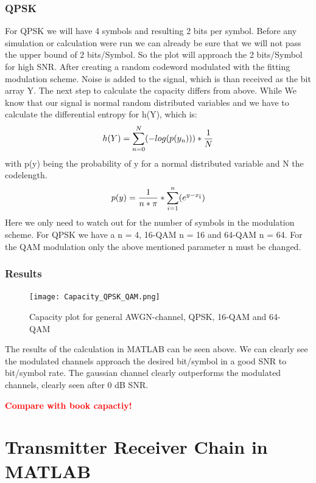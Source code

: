 \documentclass[12pt,oneside, reqno]{report}
\newcommand\boldred[1]{\textcolor{red}{\textbf{#1}}}
\begin{document}
\subsection{QPSK}
For QPSK we will have 4 symbols and resulting 2 bits per symbol. Before any simulation or calculation were run we can already be sure that we will not pass the upper bound of 2 bits/Symbol. So the plot will approach the 2 bits/Symbol for high SNR.
After creating a random codeword modulated with the fitting modulation scheme. Noise is added to the signal, which is than received as the bit array Y. The next step to calculate the capacity differs from above. While 
\newline
We know that our signal is normal random distributed variables and we have to calculate the differential entropy for h(Y), which is: 
\begin{equation}
\label{eq:entropy}
h(Y) =  \sum_{n=0}^N(-log(p(y\textsubscript{n}))) * \frac{1}{N}
\end{equation} 
with p(y) being the probability of y for a normal distributed variable and N the codelength.
\begin{equation}
p(y) = \frac{1}{n*\pi}*\sum_{i=1}^n(e^{y-x\textsubscript{i}})
\end{equation} 
Here we only need to watch out for the number of symbols in the modulation scheme. For QPSK we have a n = 4, 16-QAM n = 16 and 64-QAM n = 64.
\newline
For the QAM modulation only the above mentioned parameter n must be changed.
 

\subsection{Results}
\begin{figure}[H]
	\centering
	\texttt{[image: Capacity\_QPSK\_QAM.png]}
	\caption{Capacity plot for general AWGN-channel, QPSK, 16-QAM and 64-QAM}
	\label{fig:Modulation}
\end{figure}
The results of the calculation in MATLAB can be seen above. We can clearly see the modulated channels approach the desired bit/symbol in a good SNR to bit/symbol rate. The gaussian channel clearly outperforms the modulated channels, clearly seen after 0 dB SNR.

\boldred{Compare with book capactiy!}


\chapter{Transmitter Receiver Chain in MATLAB}
\end{document}
